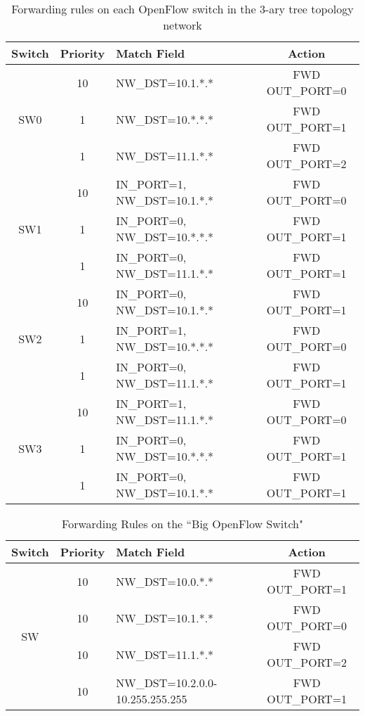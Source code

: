 \begin{table*}[t]
\caption{Forwarding rules on each OpenFlow switch in the 3-ary tree topology network}
\begin{center}
\begin{tabular}{c|clc}
\hline
Switch & Priority & Match Field & Action\\
\hline
\hline
\multirow{3}{2em}{SW0} & 10 & NW\_DST=10.1.*.* & FWD OUT\_PORT=0 \\
                       & 1  & NW\_DST=10.*.*.* & FWD OUT\_PORT=1 \\
                       & 1  & NW\_DST=11.1.*.* & FWD OUT\_PORT=2 \\
\hline
\multirow{3}{2em}{SW1} & 10 & IN\_PORT=1, NW\_DST=10.1.*.* & FWD OUT\_PORT=0 \\
                       & 1  & IN\_PORT=0, NW\_DST=10.*.*.* & FWD OUT\_PORT=1 \\
                       & 1  & IN\_PORT=0, NW\_DST=11.1.*.* & FWD OUT\_PORT=1 \\
\hline
\multirow{3}{2em}{SW2} & 10 & IN\_PORT=0, NW\_DST=10.1.*.* & FWD OUT\_PORT=1 \\
                       & 1  & IN\_PORT=1, NW\_DST=10.*.*.* & FWD OUT\_PORT=0 \\
                       & 1  & IN\_PORT=0, NW\_DST=11.1.*.* & FWD OUT\_PORT=1 \\
\hline
\multirow{3}{2em}{SW3} & 10 & IN\_PORT=1, NW\_DST=11.1.*.* & FWD OUT\_PORT=0 \\
                       & 1  & IN\_PORT=0, NW\_DST=10.*.*.* & FWD OUT\_PORT=1 \\
                       & 1  & IN\_PORT=0, NW\_DST=10.1.*.* & FWD OUT\_PORT=1 \\
\hline
\end{tabular}
\end{center}
\label{Tab:OriginalFlowTable}
\end{table*}

\begin{table*}[t]
\caption{Forwarding Rules on the ``Big OpenFlow Switch"}
\begin{center}
\begin{tabular}{c|clc}
\hline
Switch & Priority & Match Field & Action\\
\hline
\hline
\multirow{4}{2em}{SW}  & 10 & NW\_DST=10.0.*.* & FWD OUT\_PORT=1 \\
                       & 10 & NW\_DST=10.1.*.* & FWD OUT\_PORT=0 \\
                       & 10 & NW\_DST=11.1.*.* & FWD OUT\_PORT=2 \\
                       & 10 & NW\_DST=10.2.0.0-10.255.255.255 & FWD OUT\_PORT=1 \\
\hline
\end{tabular}
\end{center}
\label{Tab:CompressedFlowTable}
\end{table*}

